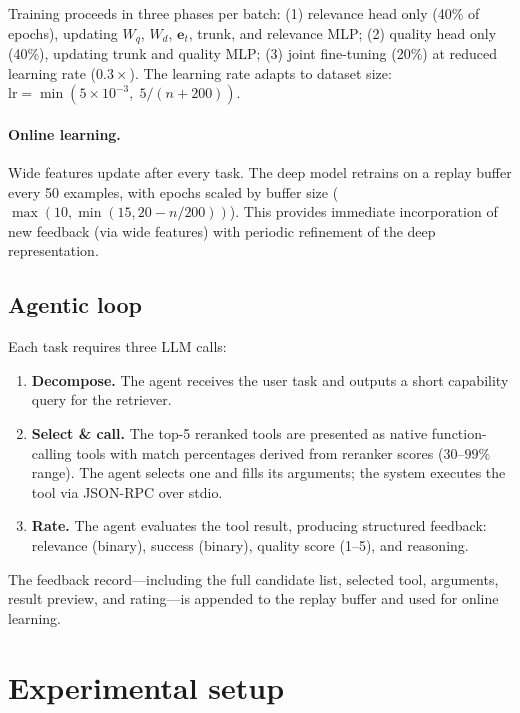\documentclass{article}
\begin{document}
Training proceeds in three phases per batch: (1) relevance head only (40\% of epochs), updating $W_q$, $W_d$, $\mathbf{e}_t$, trunk, and relevance MLP; (2) quality head only (40\%), updating trunk and quality MLP; (3) joint fine-tuning (20\%) at reduced learning rate ($0.3\times$). The learning rate adapts to dataset size: $\text{lr} = \min(5{\times}10^{-3},\; 5 / (n + 200))$.

\paragraph{Online learning.} Wide features update after every task. The deep model retrains on a replay buffer every 50 examples, with epochs scaled by buffer size ($\max(10, \min(15, 20 - n/200))$). This provides immediate incorporation of new feedback (via wide features) with periodic refinement of the deep representation.

\subsection{Agentic loop}

Each task requires three LLM calls:
\begin{enumerate}[leftmargin=*]
  \item \textbf{Decompose.} The agent receives the user task and outputs a short capability query for the retriever.
  \item \textbf{Select \& call.} The top-5 reranked tools are presented as native function-calling tools with match percentages derived from reranker scores ($30$--$99\%$ range). The agent selects one and fills its arguments; the system executes the tool via JSON-RPC over stdio.
  \item \textbf{Rate.} The agent evaluates the tool result, producing structured feedback: relevance (binary), success (binary), quality score (1--5), and reasoning.
\end{enumerate}
%
The feedback record---including the full candidate list, selected tool, arguments, result preview, and rating---is appended to the replay buffer and used for online learning.


\section{Experimental setup}
\label{sec:experiments}
\end{document}
